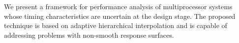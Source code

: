 We present a framework for performance analysis of multiprocessor systems whose
timing characteristics are uncertain at the design stage. The proposed technique
is based on adaptive hierarchical interpolation and is capable of addressing
problems with non-smooth response surfaces.
